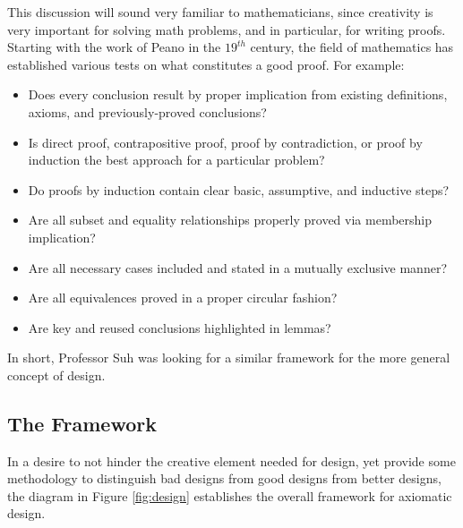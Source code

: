 This discussion will sound very familiar to mathematicians, since creativity is very important for solving math
problems, and in particular, for writing proofs.  Starting with the work of Peano in the \(19^{th}\) century, the
field of mathematics has established various tests on what constitutes a good proof.  For example:
\begin{itemize}
\item Does every conclusion result by proper implication from existing definitions, axioms, and previously-proved
  conclusions?
\item Is direct proof, contrapositive proof, proof by contradiction, or proof by induction the best approach for a
  particular problem?
\item Do proofs by induction contain clear basic, assumptive, and inductive steps?
\item Are all subset and equality relationships properly proved via membership implication?
\item Are all necessary cases included and stated in a mutually exclusive manner?
\item Are all equivalences proved in a proper circular fashion?
\item Are key and reused conclusions highlighted in lemmas?
\end{itemize}
In short, Professor Suh was looking for a similar framework for the more general concept of design.

\subsection{The Framework}

In a desire to not hinder the creative element needed for design, yet provide some methodology to distinguish bad
designs from good designs from better designs, the diagram in Figure \ref{fig:design} establishes the overall
framework for axiomatic design.

